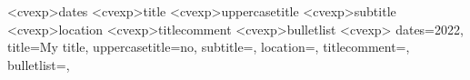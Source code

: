 \newcommand{\datesstyle}[1]{
    \textbf{#1}
}

\newcommand{\titlestyle}[1]{
    \textcolor{hltxt}{\textbf{#1}}
}

\newcommand{\subtitlestyle}[1]{
    \ifthenelse{\equal{#1}{}}
    {
        \vspace{-\baselineskip}
    }{\textcolor{subhltxt}{\textit{\textbf{#1}}}}
}

\newcommand{\locationstyle}[1]{
    \ifthenelse{\equal{#1}{}}
    {}{\textit{#1}}
}

\newcommand{\titlecommentstyle}[1]{
    \ifthenelse{\equal{#1}{}}
    {
        \vspace{-\baselineskip}
    }{#1}  %
}

\newcommand{\bulletliststyle}[1]{
    \ifthenelse{\equal{#1}{}}{}{
        \vspace{\vspacebulletvalue}
        \readlist\mylist{#1}%
        \begin{itemize} 
            \foreachitem\z\in\mylist[]{
                \item \z
            }
        \end{itemize}
        \bulletpadding
    }
}



\DeclareOptionX<cvexp>{dates}{\def\dates{#1}}
\DeclareOptionX<cvexp>{title}{\def\title{#1}}
\DeclareOptionX<cvexp>{uppercasetitle}{\def\uppercasetitle{#1}}
\DeclareOptionX<cvexp>{subtitle}{\def\subtitle{#1}}
\DeclareOptionX<cvexp>{location}{\def\location{#1}}
\DeclareOptionX<cvexp>{titlecomment}{\def\titlecomment{#1}}
\DeclareOptionX<cvexp>{bulletlist}{\def\bulletlist{#1}}
\ExecuteOptionsX<cvexp>{
    dates=2022,
    title=My title,
    uppercasetitle=no,
    subtitle=,
    location=,
    titlecomment=,
    bulletlist={},
}


